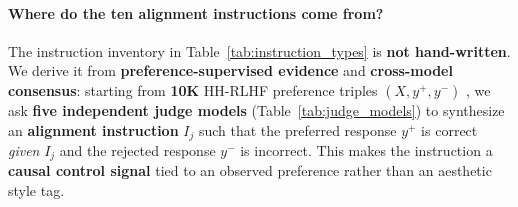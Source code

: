 \paragraph{Where do the ten alignment instructions come from?}
The instruction inventory in Table~\ref{tab:instruction_types} is \textbf{not hand-written}.
We derive it from \textbf{preference-supervised evidence} and \textbf{cross-model consensus}:
starting from \textbf{10K} HH-RLHF preference triples $(X,y^+,y^-)$ \cite{bai2022hh},
we ask \textbf{five independent judge models} (Table~\ref{tab:judge_models})
to synthesize an \textbf{alignment instruction} $I_j$ such that the preferred response $y^+$ is correct \emph{given} $I_j$ and the rejected response $y^-$ is incorrect.
This makes the instruction a \textbf{causal control signal} tied to an observed preference rather than an aesthetic style tag.



\vspace{-0.5em}
\begin{table}[h!]
\centering
\small
\setlength{\tabcolsep}{6pt}
\renewcommand{\arraystretch}{1.2}
\vspace{-0.45em}
\caption{\textbf{Judge models for instruction synthesis.}
Five independent LLM judges propose alignment instructions for the same preference pair; we keep only cases with \textbf{cross-judge semantic agreement} (Section~\ref{sec:ecliptica_benchmark}).}
\label{tab:judge_models}
\vspace{-2em}
\end{table}





